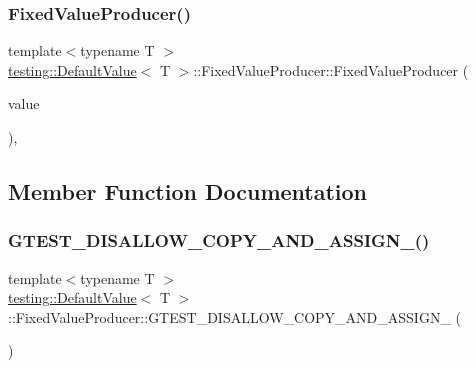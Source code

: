 \subsubsection{\texorpdfstring{FixedValueProducer()}{FixedValueProducer()}\hspace{0.1cm}{\footnotesize\ttfamily [3/3]}}
{\footnotesize\ttfamily template$<$typename T $>$ \\
\mbox{\hyperlink{classtesting_1_1_default_value}{testing\+::\+Default\+Value}}$<$ T $>$\+::Fixed\+Value\+Producer\+::\+Fixed\+Value\+Producer (\begin{DoxyParamCaption}\item[{T}]{value }\end{DoxyParamCaption})\hspace{0.3cm}{\ttfamily [inline]}, {\ttfamily [explicit]}}



\subsection{Member Function Documentation}
\mbox{\label{classtesting_1_1_default_value_1_1_fixed_value_producer_aeadb3fbaf90b8a20612b124a39809e30}} 
\subsubsection{\texorpdfstring{GTEST\_DISALLOW\_COPY\_AND\_ASSIGN\_()}{GTEST\_DISALLOW\_COPY\_AND\_ASSIGN\_()}\hspace{0.1cm}{\footnotesize\ttfamily [1/3]}}
{\footnotesize\ttfamily template$<$typename T $>$ \\
\mbox{\hyperlink{classtesting_1_1_default_value}{testing\+::\+Default\+Value}}$<$ T $>$\+::Fixed\+Value\+Producer\+::\+G\+T\+E\+S\+T\+\_\+\+D\+I\+S\+A\+L\+L\+O\+W\+\_\+\+C\+O\+P\+Y\+\_\+\+A\+N\+D\+\_\+\+A\+S\+S\+I\+G\+N\+\_\+ (\begin{DoxyParamCaption}\item[{\mbox{\hyperlink{classtesting_1_1_default_value_1_1_fixed_value_producer}{Fixed\+Value\+Producer}}}]{ }\end{DoxyParamCaption})\hspace{0.3cm}{\ttfamily [private]}}

